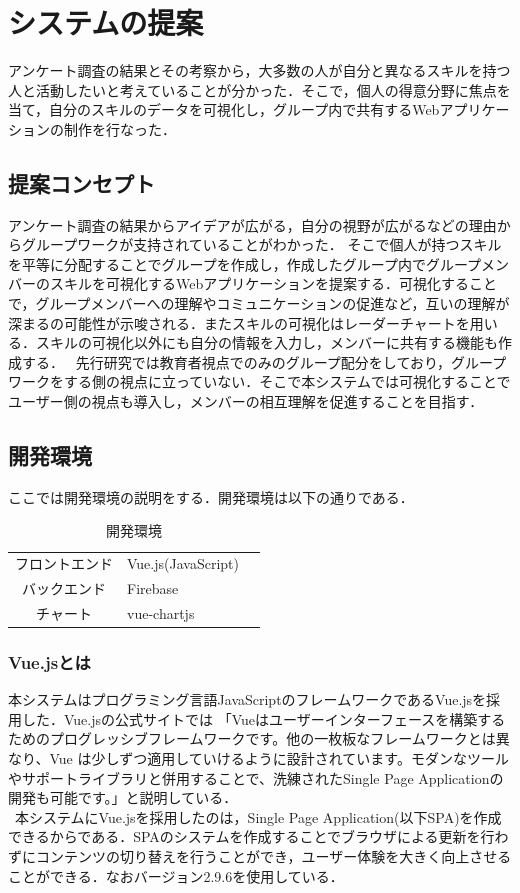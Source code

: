 \documentclass{funthesis}
\begin{document}
\chapter{システムの提案}
アンケート調査の結果とその考察から，大多数の人が自分と異なるスキルを持つ人と活動したいと考えていることが分かった．そこで，個人の得意分野に焦点を当て，自分のスキルのデータを可視化し，グループ内で共有するWebアプリケーションの制作を行なった．

\section{提案コンセプト}
アンケート調査の結果からアイデアが広がる，自分の視野が広がるなどの理由からグループワークが支持されていることがわかった．
そこで個人が持つスキルを平等に分配することでグループを作成し，作成したグループ内でグループメンバーのスキルを可視化するWebアプリケーションを提案する．可視化することで，グループメンバーへの理解やコミュニケーションの促進など，互いの理解が深まるの可能性が示唆される．またスキルの可視化はレーダーチャートを用いる．スキルの可視化以外にも自分の情報を入力し，メンバーに共有する機能も作成する．
\ 先行研究では教育者視点でのみのグループ配分をしており，グループワークをする側の視点に立っていない．そこで本システムでは可視化することでユーザー側の視点も導入し，メンバーの相互理解を促進することを目指す．
\section{開発環境}
ここでは開発環境の説明をする．開発環境は以下の通りである．
\begin{table}[h]
\begin{center}

  \caption{開発環境}
  \begin{tabular}{cll} \hline
    フロントエンド & Vue.js(JavaScript)  \tabularnewline
    バックエンド& Firebase\tabularnewline
    チャート &vue-chartjs \tabularnewline
    \hline
  \end{tabular}
  \label{開発環境}
  \end{center}
\end{table}

\subsection{Vue.jsとは}
本システムはプログラミング言語JavaScriptのフレームワークであるVue.jsを採用した．Vue.jsの公式サイトでは
「Vueはユーザーインターフェースを構築するためのプログレッシブフレームワークです。他の一枚板なフレームワークとは異なり、Vue は少しずつ適用していけるように設計されています。モダンなツールやサポートライブラリと併用することで、洗練されたSingle Page Applicationの開発も可能です。」\cite{A16}と説明している．\\
\ 本システムにVue.jsを採用したのは，Single Page Application(以下SPA)を作成できるからである．SPAのシステムを作成することでブラウザによる更新を行わずにコンテンツの切り替えを行うことができ，ユーザー体験を大きく向上させることができる．なおバージョン2.9.6を使用している．
\end{document}
